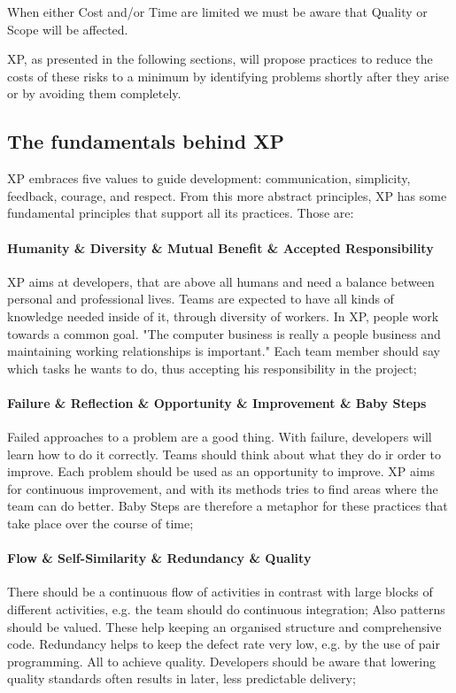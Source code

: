 \documentclass[conference]{IEEEtran}
\begin{document}
When either Cost and/or Time are limited we must be aware that Quality or Scope will be affected.

XP, as presented in the following sections, will propose practices to reduce the costs of these risks to a minimum by identifying problems shortly after they arise or by avoiding them completely. 

\subsection{The fundamentals behind XP}
XP embraces five values to guide development: communication, simplicity, feedback, courage, and respect. From this more abstract principles, XP has some fundamental principles that support all its practices. Those are:
\paragraph{Humanity \& Diversity \& Mutual Benefit \& Accepted Responsibility} XP aims at developers, that are above all humans and need a balance between personal and professional lives. Teams are expected to have all kinds of knowledge needed inside of it, through diversity of workers. In XP, people work towards a common goal. "The computer business is really a people business and maintaining working relationships is important."\cite{Beck:2004tc} Each team member should say which tasks he wants to do, thus accepting his responsibility in the project;
\paragraph{Failure \& Reflection \& Opportunity \& Improvement \& Baby Steps} Failed approaches to a problem are a good thing. With failure, developers will learn how to do it correctly. Teams should think about what they do ir order to improve. Each problem should be used as an opportunity to improve.  XP aims for continuous improvement, and with its methods tries to find areas where the team can do better. Baby Steps are therefore a metaphor for these practices that take place over the course of time;
\paragraph{Flow \& Self-Similarity \& Redundancy \& Quality} There should be a continuous flow of activities in contrast with large blocks of different activities, e.g. the team should do continuous integration; Also patterns should be valued. These help keeping an organised structure and comprehensive code. Redundancy helps to keep the defect rate very low, e.g. by the use of pair programming. All to achieve quality. Developers should be aware that lowering quality standards often results in later, less predictable delivery;
\end{document}
